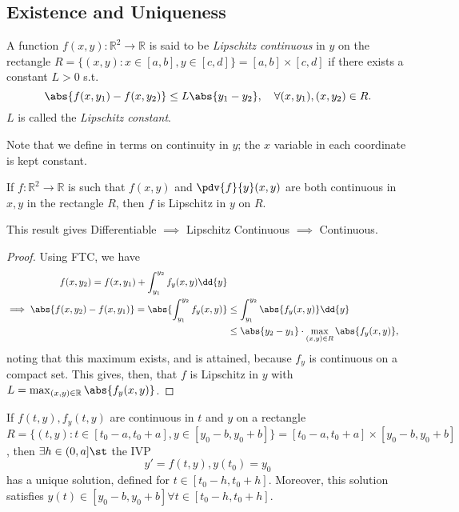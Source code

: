 \subsection{Existence and Uniqueness}

\begin{definition}
    A function $f(x, y) : \mathbb{R}^2 \to \mathbb{R}$ is said to be \emph{Lipschitz continuous} in $y$ on the rectangle $R = \{(x, y) : x \in [a, b], y \in [c, d]\} = [a, b] \times [c ,d]$ if there exists a constant $L > 0$ s.t. \[
    \abs{f(x, y_1) - f(x, y_2)}    \leq L \abs{y_1 - y_2}, \quad \forall (x, y_1), (x, y_2) \in R.
    \]
    $L$ is called the \emph{Lipschitz constant}.
\end{definition}

\begin{remark}
    Note that we define in terms on continuity in $y$; the $x$ variable in each coordinate is kept constant.
\end{remark}

\begin{lemma}
    If $f: \mathbb{R}^2 \to \mathbb{R}$ is such that $f(x, y)$ and $\pdv{f}{y}(x, y)$ are both continuous in $x, y$ in the rectangle $R$, then $f$ is Lipschitz in $y$ on $R$.
\end{lemma}

\begin{remark}
    This result gives Differentiable $\implies$ Lipschitz Continuous $\implies$ Continuous.
\end{remark}

\begin{proof}
    Using FTC, we have \begin{align*}
    f(x, y_2) = f(x, y_1) + \int_{y_1}^{y_2} f_y(x, y)\dd{y}    \\
    \implies \abs{f(x, y_2) - f(x, y_1)} = \abs{\int_{y_1}^{y_2} f_y(x, y)} &\leq \int_{y_1}^{y_2} \abs{f_y(x, y)} \dd{y}\\
    &\leq \abs{y_2 - y_1} \cdot \max_{(x, y) \in R}\abs{f_y(x, y)},
    \end{align*}
noting that this maximum exists, and is attained, because $f_y$ is continuous on a compact set. This gives, then, that $f$ is Lipschitz in $y$ with $L = \max_{(x, y) \in \mathbb{R}} \abs{f_y (x, y)}$.
\end{proof}

\begin{theorem}
    If $f(t, y), f_y(t, y)$ are continuous in $t$ and $y$ on a rectangle $R = \{(t, y) : t \in [t_0- a, t_0 + a], y \in [y_0 - b, y_0 + b]\} = [t_0 - a, t_0 + a] \times [y_0 - b, y_0 + b]$, then $\exists h \in (0, a] \st$ the IVP $$y' = f(t, y), y(t_0) = y_0$$ has a unique solution, defined for $t \in [t_0 - h, t_0 + h]$. Moreover, this solution satisfies $y(t) \in [y_0 - b, y_0 + b] \forall t \in [t_0 - h, t_0 + h]$.
\end{theorem}

